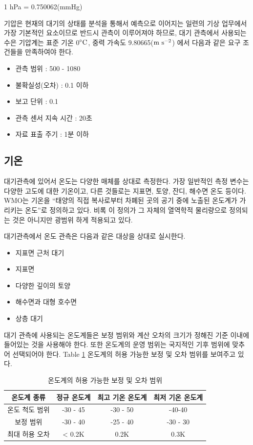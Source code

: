 \begin{itemize}
{1 hPa = 0.750062(mmHg)

기압은 현재의 대기의 상태를 분석을 통해서 예측으로 이어지는 일련의 기상 업무에서 가장 기본적인 요소이므로 반드시 관측이 이루어져야 하므로, 대기 관측에서 사용되는 수은 기압계는 표준 기온 0$\rm ^{\circ}C$, 중력 가속도 9.80665($\rm m~s^{-2}$) 에서 다음과 같은 요구 조건들을 만족하여야 한다.

\begin{itemize}
	\item 관측 범위 : 500 - 1080
	\item 불확실성(오차) : 0.1 이하
	\item 보고 단위 : 0.1
	\item 관측 센서 지속 시간 : 20초
	\item 자료 표출 주기 : 1분 이하
\end{itemize}

\subsection{기온}

대기관측에 있어서 온도는 다양한 매체를 상대로 측정한다. 가장 일반적인 측정 변수는 다양한 고도에 대한 기온이고, 다른 것들로는 지표면, 토양, 잔디, 해수면 온도 등이다. WMO는 기온을 “태양의 직접 복사로부터 차폐된 곳의 공기 중에 노출된 온도계가 가리키는 온도”로 정의하고 있다. 비록 이 정의가 그 자체의 열역학적 물리량으로 정의되는 것은 아니지만 광범위 하게 적용되고 있다.

대기관측에서 온도 관측은 다음과 같은 대상을 상대로 실시한다.
\begin{itemize}
	\item 지표면 근처 대기
	\item 지표면
	\item 다양한 깊이의 토양
	\item 해수면과 대형 호수면
	\item 상층 대기
\end{itemize}

대기 관측에 사용되는 온도계들은 보정 범위와 계산 오차의 크기가 정해진 기준 이내에 들어있는 것을 사용해야 한다. 또한 온도계의 운영 범위는 국지적인 기후 범위에 맞추어 선택되어야 한다. Table \ref{table:22} \은 온도계의 허용 가능한 보정 및 오차 범위를 보여주고 있다.

\begin{table}[h]
	\centering
	\caption{온도계의 허용 가능한 보정 및 오차 범위}
\begin{tabular}{c|c|c|c}
	\hline 
	온도계 종류 & 정규 온도계 & 최고 기온 온도계 & 최저 기온 온도계 \\ 	\hline 
	온도 척도 범위 & -30 - 45 & -30 - 50 & -40-40 \\ 	\hline 
	보정 범위 & -30 - 40 & -25 - 40 & -30 - 30 \\ \hline 
	최대 허용 오차 & < 0.2K  & 0.2K & 0.3K  \\ 	\hline 
\end{tabular} 
	\label{table:22}
\end{table}

}
\end{itemize}
